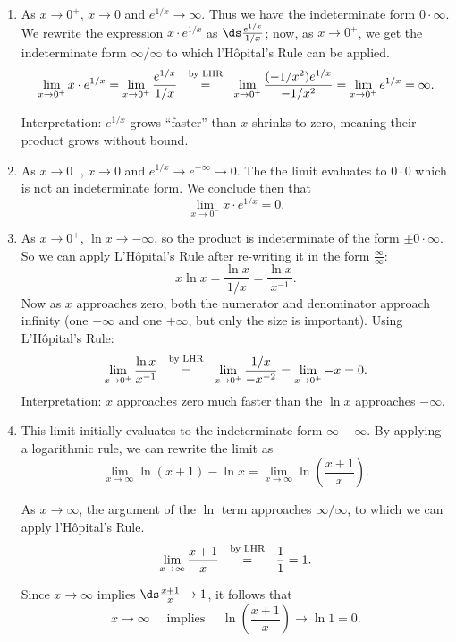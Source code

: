 \begin{solution}
{\begin{enumerate}
\item		As $x\rightarrow 0^+$, $x\rightarrow 0$ and $e^{1/x}\rightarrow \infty$. Thus we have the indeterminate form $0\cdot\infty$. We rewrite the expression $x\cdot e^{1/x}$ as $\ds\frac{e^{1/x}}{1/x}$; now, as $x\rightarrow 0^+$, we get the indeterminate form $\infty/\infty$ to which l'H\^opital's Rule can be applied. 
$$ \lim_{x\to0^+} x\cdot e^{1/x} = \lim_{x\to 0^+} \frac{e^{1/x}}{1/x} \stackrel{\ \text{ by LHR \rule[-5pt]{0pt}{3pt}} \ }{=} \lim_{x\to 0^+}\frac{(-1/x^2)e^{1/x}}{-1/x^2} =\lim_{x\to 0^+}e^{1/x} =\infty.$$

Interpretation: $e^{1/x}$ grows ``faster'' than $x$ shrinks to zero, meaning their product grows without bound.

\item		As $x\rightarrow 0^-$, $x\rightarrow 0$ and $e^{1/x}\rightarrow e^{-\infty}\rightarrow 0$. The the limit evaluates to $0\cdot 0$ which is not an indeterminate form. We conclude then that $$\lim_{x\to 0^-}x\cdot e^{1/x} = 0.$$

\item As $x\to 0^+$, $\ln x\to -\infty$, so the product is indeterminate of the form $\pm 0\cdot\infty $.
 So we can  apply L'H\^opital's Rule after re-writing it in the form $\frac{\infty }{\infty }$:
$$x\ln x = \frac{\ln x}{1/x}=\frac{\ln x}{x^{-1}}.$$
Now as $x$ approaches zero, both the numerator and denominator
approach infinity (one $-\infty$ and one $+\infty$, but only the size
is important). Using  L'H\^opital's Rule:
$$\lim_{x\to 0^+} {\ln x\over x^{-1}}\stackrel{\ \text{ by LHR \rule[-5pt]{0pt}{3pt}} \ }{=}
\lim_{x\to 0^+} {1/x\over -x^{-2}} =\lim_{x\to 0^+} -x = 0.$$
Interpretation: $x$ approaches zero much faster than the $\ln x$ approaches $-\infty$.
\item		This limit initially evaluates to the indeterminate form $\infty-\infty$. By applying a logarithmic rule, we can rewrite the limit as 
$$ \lim_{x\to\infty} \ln(x+1)-\ln x = \lim_{x\to \infty} \ln \left(\frac{x+1}x\right).$$

As $x\rightarrow \infty$, the argument of the $\ln$ term approaches $\infty/\infty$, to which we can apply l'H\^opital's Rule.
$$\lim_{x\to\infty} \frac{x+1}x \stackrel{\ \text{ by LHR \rule[-5pt]{0pt}{3pt}} \ }{=} \frac11=1.$$

Since $x\rightarrow \infty$ implies $\ds\frac{x+1}x\rightarrow 1$, it follows that 
$$x\rightarrow \infty \quad \text{ implies }\quad \ln\left(\frac{x+1}x\right)\rightarrow \ln 1=0.$$


\end{enumerate}}
\end{solution}
